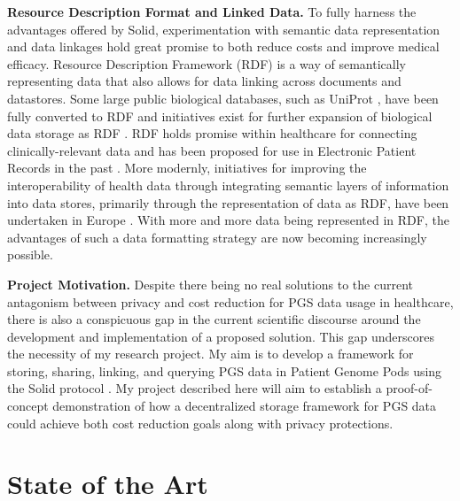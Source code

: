 \documentclass[runningheads]{llncs}
\begin{document}
\textbf{Resource Description Format and Linked Data.}
To fully harness the advantages offered by Solid, experimentation with semantic data representation and data linkages hold great promise to both reduce costs and improve medical efficacy.
Resource Description Framework (RDF) is a way of semantically representing data that also allows for data linking across documents and datastores.
Some large public biological databases, such as UniProt \cite{theuniprotconsortium_uniprot_2017}, have been fully converted to RDF and initiatives exist for further expansion of biological data storage as RDF \cite{sib_swiss_institute_of_bioinformatics_rdf_group_members_sib_2024}.
RDF holds promise within healthcare for connecting clinically-relevant data and has been proposed for use in Electronic Patient Records in the past \cite{lindemann_resource_2008}.
More modernly, initiatives for improving the interoperability of health data through integrating semantic layers of information into data stores, primarily through the representation of data as RDF, have been undertaken in Europe \cite{van_der_horst_bridging_2023}.
With more and more data being represented in RDF, the advantages of such a data formatting strategy are now becoming increasingly possible.


\textbf{Project Motivation.}
Despite there being no real solutions to the current antagonism between privacy and cost reduction for PGS data usage in healthcare, there is also a conspicuous gap in the current scientific discourse around the development and implementation of a proposed solution. 
This gap underscores the necessity of my research project.
My aim is to develop a framework for storing, sharing, linking, and querying PGS data in Patient Genome Pods using the Solid protocol \cite{capadisli_solid_nodate}.
My project described here will aim to establish a proof-of-concept demonstration of how a decentralized storage framework for PGS data could achieve both cost reduction goals along with privacy protections.


\section{State of the Art}

\end{document}
